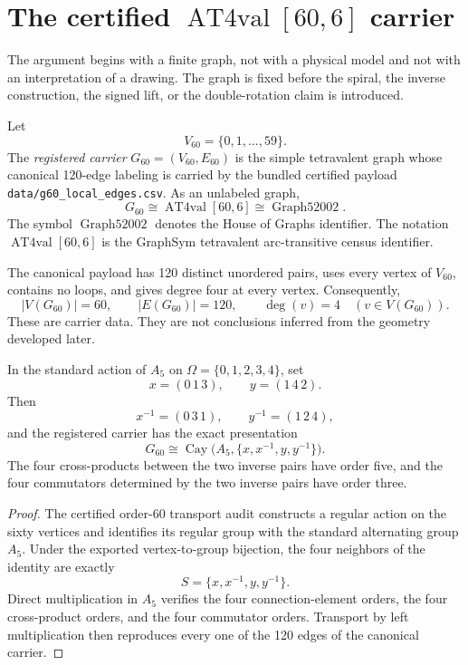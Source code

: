 \section{The certified \texorpdfstring{$\operatorname{AT4val}[60,6]$}{AT4val[60,6]} carrier}

The argument begins with a finite graph, not with a physical model and not
with an interpretation of a drawing.  The graph is fixed before the spiral,
the inverse construction, the signed lift, or the double-rotation claim is
introduced.

\begin{definition}
Let
\[
    V_{60}=\{0,1,\ldots,59\}.
\]
The \emph{registered carrier} \(G_{60}=(V_{60},E_{60})\) is the simple
tetravalent graph whose canonical 120-edge labeling is carried by the
bundled certified payload
\texttt{data/g60\_local\_edges.csv}.  As an unlabeled graph,
\[
    G_{60}\cong \operatorname{AT4val}[60,6]
    \cong \operatorname{Graph52002}.
\]
The symbol \(\operatorname{Graph52002}\) denotes the House of Graphs
identifier.  The notation \(\operatorname{AT4val}[60,6]\) is the GraphSym
tetravalent arc-transitive census identifier.
\end{definition}

The canonical payload has 120 distinct unordered pairs, uses every vertex
of \(V_{60}\), contains no loops, and gives degree four at every vertex.
Consequently,
\[
    |V(G_{60})|=60,
    \qquad
    |E(G_{60})|=120,
    \qquad
    \deg(v)=4
    \quad
    (v\in V(G_{60})).
\]
These are carrier data.  They are not conclusions inferred from the
geometry developed later.

\begin{proposition}
In the standard action of \(A_{5}\) on
\(\Omega=\{0,1,2,3,4\}\), set
\[
    x=(0\,1\,3),
    \qquad
    y=(1\,4\,2).
\]
Then
\[
    x^{-1}=(0\,3\,1),
    \qquad
    y^{-1}=(1\,2\,4),
\]
and the registered carrier has the exact presentation
\[
    G_{60}
    \cong
    \operatorname{Cay}
    \bigl(
        A_{5},
        \{x,x^{-1},y,y^{-1}\}
    \bigr).
\]
The four cross-products between the two inverse pairs have order five, and
the four commutators determined by the two inverse pairs have order three.
\end{proposition}

\begin{proof}
The certified order-60 transport audit constructs a regular action on the
sixty vertices and identifies its regular group with the standard
alternating group \(A_{5}\).  Under the exported vertex-to-group bijection,
the four neighbors of the identity are exactly
\[
    S=\{x,x^{-1},y,y^{-1}\}.
\]
Direct multiplication in \(A_{5}\) verifies the four connection-element
orders, the four cross-product orders, and the four commutator orders.
Transport by left multiplication then reproduces every one of the 120
edges of the canonical carrier.
\end{proof}

